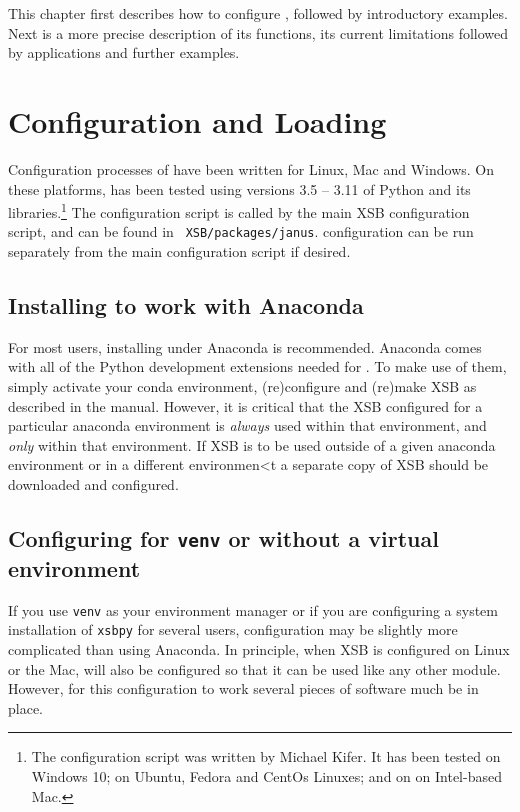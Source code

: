 
This chapter first describes how to configure \janusplg , followed by
introductory examples.  Next is a more precise description of its
functions, its current limitations followed by applications and
further examples.

\section{Configuration and Loading}

Configuration processes of \janusplg{} have been written for Linux,
Mac and Windows.  On these platforms, \janusplg{} has been tested
using versions 3.5 -- 3.11 of Python and its libraries.\footnote{The
\janusplg{} configuration script was written by Michael Kifer.  It has
been tested on Windows 10; on Ubuntu, Fedora and CentOs Linuxes; and
on on Intel-based Mac.}  The \janusplg configuration script is
called by the main XSB configuration script, and can be found in {\tt
  XSB/packages/janus}.  \janusplg configuration can be run
separately from the main configuration script if desired.

\subsection{Installing \janusplg{} to work with Anaconda}

For most users, installing \janusplg under Anaconda is recommended.
Anaconda comes with all of the Python development extensions needed
for \janusplg.  To make use of them, simply activate your conda
environment, (re)configure and (re)make XSB as described in the
manual.  However, it is critical that the XSB configured for a
particular anaconda environment is {\em always} used within that
environment, and {\em only} within that environment.  If XSB is to be
used outside of a given anaconda environment or in a different
environmen<t a separate copy of XSB should be downloaded and configured.

\subsection{Configuring \janusplg{} for {\tt venv} or without a virtual environment} \label{sec:xsbpy-linux}

If you use {\tt venv} as your environment manager or if you are
configuring a system installation of {\tt xsbpy} for several users,
configuration may be slightly more complicated than using Anaconda.
In principle, when XSB is configured on Linux or the Mac, \janusplg{}
will also be configured so that it can be used like any other 
module.  However, for this configuration to work several pieces of
software much be in place.

